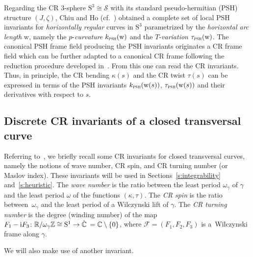 \documentclass[pdftex]{sigma}
\numberwithin{equation}{section}
\def\C{\mathbb{C}}
\def\R{\mathbb{R}}
\def\Z{\mathbb{Z}}
\begin{document}
\begin{Remark}
Regarding the CR 3-sphere $\mathrm{S}^3\cong \mathcal{S}$ with its standard pseudo-her\-mi\-tian (PSH) structure $(J,\zeta)$,
Chiu and Ho (cf.~\cite{Chiu-Ho2019})
obtained a complete set of local PSH invariants
for \textit{horizontally regular} curves in $\mathrm{S}^3$
parametrized by the \textit{horizontal arc length} $\mathrm{w}$, namely
the $p$-\textit{curvature} $k_{\textsc{psh}}(\mathrm{w})$ and the $T$-\textit{variation} $\tau_{\textsc{psh}}(\mathrm{w})$.
The canonical PSH frame field
producing
the PSH invariants originates a
CR frame field which can be further adapted to a canonical CR frame following the reduction
procedure developed
in~\cite{MNS-Kharkiv}.
From this one can read the CR invariants.
%
Thus, in principle, the CR bending $\kappa(s)$ and the CR twist $\tau(s)$ can be
expressed in terms of the PSH invariants $k_{\textsc{psh}}(\mathrm{w}(s))$, $\tau_{\textsc{psh}}(\mathrm{w}(s))$
and their derivatives with respect to $s$.
\end{Remark}
\subsection{Discrete CR invariants of a closed transversal curve}

Referring to~\cite{MNS-Kharkiv,MS}, we briefly recall some CR invariants for closed transversal curves, namely
the notions of wave number, CR spin, and CR turning number (or Maslov index). These invariants will be used in Sections~\ref{s:integrability} and~\ref{s:heuristic}.
The \textit{wave number} is the ratio between the least period $\omega_{\gamma}$ of $\gamma$ and the least period $\omega$ of
the functions $(\kappa,\tau)$. The \textit{CR spin} is the ratio between~$\omega_{\gamma}$ and the least period
of a Wilczynski lift of $\gamma$.
The \textit{CR turning number} is
the degree (winding number) of the map
$F_1-{\rm i}F_3\colon \R/\omega_{\gamma}\Z \cong \mathrm{S}^1 \to \dot{\C}\: = \mathbb{C}\setminus \{0\}$,
where $\mathcal{F}=(F_1,F_2,F_3)$ is a~Wilczynski frame along $\gamma$.

We will also make use of another invariant.
\end{document}
